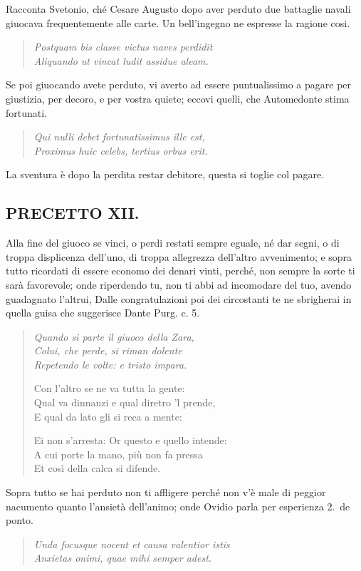 \documentclass[11pt,a6paper]{article}
\newcommand{\literaryquote}[1]{%
\kern -6pt  \begin{verse}
    {\footnotesize \it #1}
  \end{verse}\kern -2pt%
}
\begin{document}
{Racconta Svetonio, ché Cesare Augusto dopo aver
perduto due battaglie navali giuocava frequentemente
alle carte. Un bell'ingegno ne espresse la ragione
cosi.
\literaryquote{Postquam bis classe victus naves perdidit\\
Aliquando ut vincat ludit assidue aleam.}

Se poi giuocando avete perduto, vi averto ad essere
puntualissimo a pagare per giustizia, per decoro,
e per vostra quiete; eccovi quelli, che Automedonte
stima fortunati.
\literaryquote{Qui nulli debet fortunatissimus ille est, \\
Proximus huic celebs, tertius orbus erit.}

La sventura è dopo la perdita restar debitore,
questa si toglie col pagare.
}


\subsection{PRECETTO XII.}

Alla fine del giuoco se vinci, o perdi restati
sempre eguale, né dar segni, o di
troppa displicenza dell'uno, di troppa allegrezza
dell'altro avvenimento; e sopra
tutto ricordati di essere economo dei denari
vinti, perché, non sempre la sorte ti sarà
favorevole; onde riperdendo tu, non ti abbi
ad incomodare del tuo, avendo guadagnato
l'altrui, Dalle congratulazioni poi dei circostanti
te ne sbrigherai in quella guisa che suggerisce Dante Purg. c. 5.
\literaryquote{
Quando si parte il giuoco della Zara,\\
Colui, che perde, si riman dolente\\
Repetendo le volte: e tristo impara.

Con l'altro se ne va tutta la gente:\\
Qual va dinnanzi e qual diretro 'l prende,\\
E qual da lato gli si reca a mente:

Ei non s'arresta: Or questo e quello intende:\\
A cui porte la mano, più non fa pressa\\
Et così della calca si difende.\\}

Sopra tutto se hai perduto non ti affligere
perché non v'è male di peggior nacumento
quanto l'ansietà dell'animo; onde Ovidio
parla per esperienza 2.\ de ponto.

\literaryquote{Unda focusque nocent et causa valentior istis\\
Anxietas onimi, quae mihi semper adest.}
\end{document}
